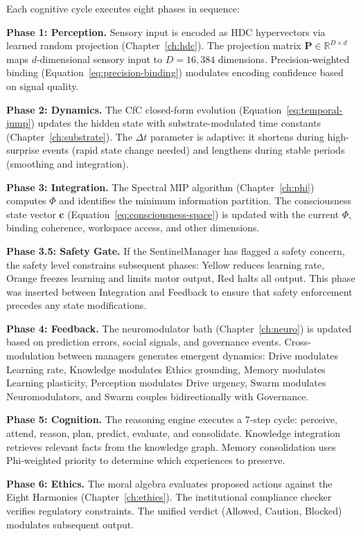 \documentclass[12pt]{book}
\newcommand{\R}{\mathbb{R}}
\begin{document}
Each cognitive cycle executes eight phases in sequence:

\textbf{Phase 1: Perception.} Sensory input is encoded as HDC hypervectors via learned random projection (Chapter~\ref{ch:hdc}). The projection matrix $\mathbf{P} \in \R^{D \times d}$ maps $d$-dimensional sensory input to $D = 16{,}384$ dimensions. Precision-weighted binding (Equation~\ref{eq:precision-binding}) modulates encoding confidence based on signal quality.

\textbf{Phase 2: Dynamics.} The CfC closed-form evolution (Equation~\ref{eq:temporal-jump}) updates the hidden state with substrate-modulated time constants (Chapter~\ref{ch:substrate}). The $\Delta t$ parameter is adaptive: it shortens during high-surprise events (rapid state change needed) and lengthens during stable periods (smoothing and integration).

\textbf{Phase 3: Integration.} The Spectral MIP algorithm (Chapter~\ref{ch:phi}) computes $\Phi$ and identifies the minimum information partition. The consciousness state vector $\mathbf{c}$ (Equation~\ref{eq:consciousness-space}) is updated with the current $\Phi$, binding coherence, workspace access, and other dimensions.

\textbf{Phase 3.5: Safety Gate.} If the SentinelManager has flagged a safety concern, the safety level constrains subsequent phases: Yellow reduces learning rate, Orange freezes learning and limits motor output, Red halts all output. This phase was inserted between Integration and Feedback to ensure that safety enforcement precedes any state modifications.

\textbf{Phase 4: Feedback.} The neuromodulator bath (Chapter~\ref{ch:neuro}) is updated based on prediction errors, social signals, and governance events. Cross-modulation between managers generates emergent dynamics: Drive modulates Learning rate, Knowledge modulates Ethics grounding, Memory modulates Learning plasticity, Perception modulates Drive urgency, Swarm modulates Neuromodulators, and Swarm couples bidirectionally with Governance.

\textbf{Phase 5: Cognition.} The reasoning engine executes a 7-step cycle: perceive, attend, reason, plan, predict, evaluate, and consolidate. Knowledge integration retrieves relevant facts from the knowledge graph. Memory consolidation uses Phi-weighted priority to determine which experiences to preserve.

\textbf{Phase 6: Ethics.} The moral algebra evaluates proposed actions against the Eight Harmonies (Chapter~\ref{ch:ethics}). The institutional compliance checker verifies regulatory constraints. The unified verdict (Allowed, Caution, Blocked) modulates subsequent output.
\end{document}
